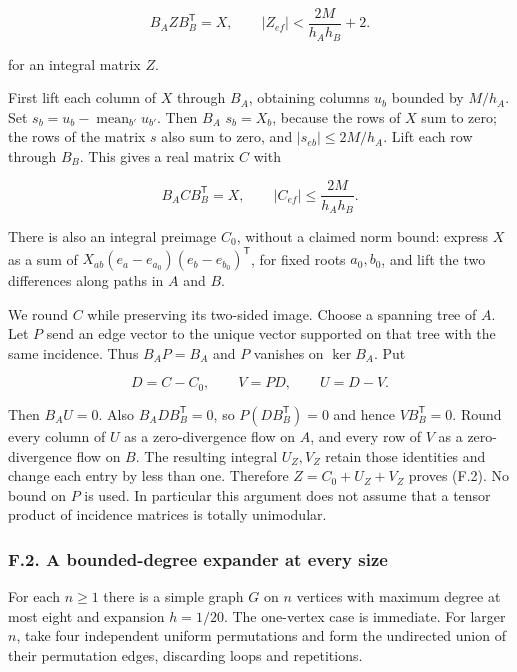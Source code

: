 \documentclass[english,11pt,a4paper]{article}
\begin{document}
\[B_A Z B_B^{\mathsf T}=X,\qquad |Z_{ef}|<\frac{2M}{h_Ah_B}+2.\tag{F.2}\]

for an integral matrix \(Z\).

First lift each column of \(X\) through \(B_{A}\), obtaining columns \(u_{b}\) bounded by \(M/h_{A}\). Set \(s_b=u_b-\operatorname{mean}_{b\prime}u_{b\prime}\). Then \(B_{A}\) \(s_{b}=X_{b}\), because the rows of \(X\) sum to zero; the rows of the matrix \(s\) also sum to zero, and \(|s_{eb}|\le 2M/h_{A}\). Lift each row through \(B_{B}\). This gives a real matrix \(C\) with

\[B_A C B_B^{\mathsf T}=X,\qquad |C_{ef}|\le\frac{2M}{h_Ah_B}.\tag{F.3}\]

There is also an integral preimage \(C_{0}\), without a claimed norm bound: express \(X\) as a sum of \(X_{ab}(e_a-e_{a_0})(e_b-e_{b_0})^{\mathsf T}\), for fixed roots \(a_0,b_0\), and lift the two differences along paths in \(A\) and \(B\).

We round \(C\) while preserving its two-sided image. Choose a spanning tree of \(A\). Let \(P\) send an edge vector to the unique vector supported on that tree with the same incidence. Thus \(B_AP=B_A\) and \(P\) vanishes on \(\ker B_A\). Put

\[D=C-C_0,\qquad V=PD,\qquad U=D-V.\]

Then \(B_AU=0\). Also \(B_A D B_B^{\mathsf T}=0\), so \(P(DB_B^{\mathsf T})=0\) and hence \(VB_B^{\mathsf T}=0\). Round every column of \(U\) as a zero-divergence flow on \(A\), and every row of \(V\) as a zero-divergence flow on \(B\). The resulting integral \(U_{Z},V_{Z}\) retain those identities and change each entry by less than one. Therefore \(Z=C_{0}+U_{Z}+V_{Z}\) proves (F.2). No bound on \(P\) is used. In particular this argument does not assume that a tensor product of incidence matrices is totally unimodular.

\subsubsection{F.2. A bounded-degree expander at every size}\label{f.2.-a-bounded-degree-expander-at-every-size}

For each \(n\ge 1\) there is a simple graph \(G\) on \(n\) vertices with maximum degree at most eight and expansion \(h=1/20\). The one-vertex case is immediate. For larger \(n\), take four independent uniform permutations and form the undirected union of their permutation edges, discarding loops and repetitions.
\end{document}
